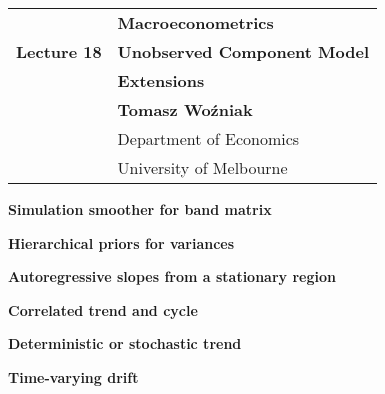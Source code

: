 \documentclass[notes,blackandwhite,mathsans,usenames,dvipsnames]{beamer}
\begin{document}







{
\begin{frame}

\vspace{1cm}
\begin{tabular}{rl}
&\textbf{\LARGE\color{mcxs3} Macroeconometrics}\\[8ex]
\textbf{\Large Lecture 18}&\textbf{\Large\color{mcxs2}Unobserved Component Model}\\[1ex] &\textbf{\Large\color{mcxs2}Extensions}\\[15ex]
&\textbf{Tomasz Wo\'zniak}\\[1ex]
&{\small\color{mcxs2} Department of Economics}\\
&{\small\color{mcxs2}University of Melbourne}
\end{tabular}

\end{frame}
}




{
\begin{frame}

\vspace{1cm}\textbf{\color{mcxs2}Simulation smoother for band matrix}

\bigskip\textbf{\color{mcxs1}Hierarchical priors for variances}

\bigskip\textbf{\color{mcxs2}Autoregressive slopes from a stationary region}

\bigskip\textbf{\color{mcxs2}Correlated trend and cycle}

\bigskip\textbf{\color{mcxs2}Deterministic or stochastic trend}

\bigskip\textbf{\color{mcxs2}Time-varying drift}


%

%

\end{frame}
}
\end{document}
